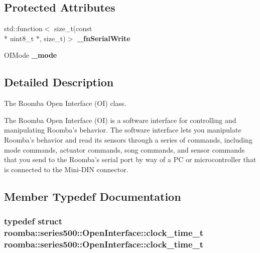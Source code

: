 \subsection*{Protected Attributes}
\begin{DoxyCompactItemize}
\item 
\hypertarget{classroomba_1_1series500_1_1_open_interface_adc93297613591cfdb94229ac1da0befd}{std\+::function$<$ size\+\_\+t(const \\*
uint8\+\_\+t $\ast$, size\+\_\+t)$>$ {\bfseries \+\_\+fn\+Serial\+Write}}\label{classroomba_1_1series500_1_1_open_interface_adc93297613591cfdb94229ac1da0befd}

\item 
\hypertarget{classroomba_1_1series500_1_1_open_interface_a2491dd5d1efe4358d7d5b76e272163c3}{O\+I\+Mode {\bfseries \+\_\+mode}}\label{classroomba_1_1series500_1_1_open_interface_a2491dd5d1efe4358d7d5b76e272163c3}

\end{DoxyCompactItemize}


\subsection{Detailed Description}
The Roomba Open Interface (O\+I) class. 

The Roomba Open Interface (O\+I) is a software interface for controlling and manipulating Roomba’s behavior. The software interface lets you manipulate Roomba’s behavior and read its sensors through a series of commands, including mode commands, actuator commands, song commands, and sensor commands that you send to the Roomba’s serial port by way of a P\+C or microcontroller that is connected to the Mini-\/\+D\+I\+N connector. 

\subsection{Member Typedef Documentation}
\hypertarget{classroomba_1_1series500_1_1_open_interface_a28e1b87b0cce69349c416a7fcda3d624}{
\subsubsection[{clock\+\_\+time\+\_\+t}]{\setlength{\rightskip}{0pt plus 5cm}typedef struct {\bf roomba\+::series500\+::\+Open\+Interface\+::clock\+\_\+time\+\_\+t}  {\bf roomba\+::series500\+::\+Open\+Interface\+::clock\+\_\+time\+\_\+t}}}\label{classroomba_1_1series500_1_1_open_interface_a28e1b87b0cce69349c416a7fcda3d624}


